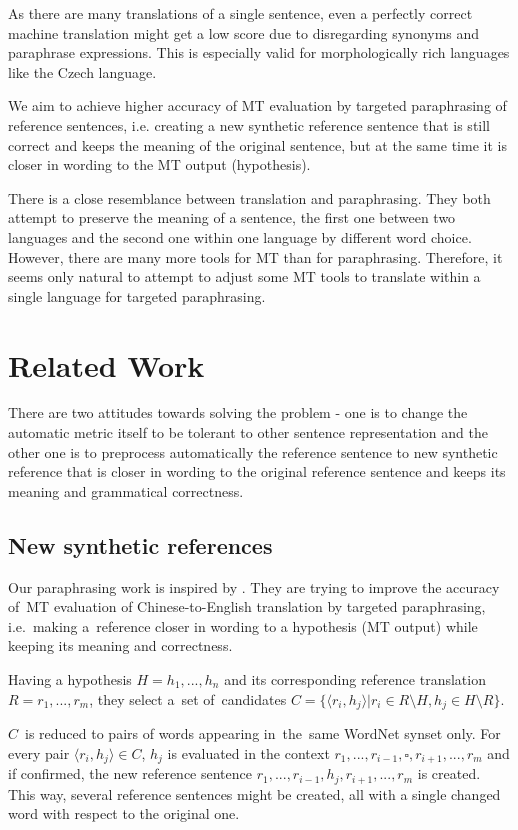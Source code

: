 \documentclass[11pt]{article}
\begin{document}
As there are many translations of a single sentence, even a perfectly correct 
machine translation might get a low score due to disregarding synonyms and 
paraphrase expressions. This is especially valid for morphologically rich 
languages like the Czech language. \cite{bojar-tackling-sparse-data}

%


We aim to achieve higher accuracy of MT evaluation by targeted paraphrasing 
of reference sentences, i.e. creating a new synthetic reference sentence that 
is still correct and keeps the meaning of the original sentence, but at the 
same time it is closer in wording to the MT output (hypothesis). 

There is a close resemblance between translation and paraphrasing. They both 
attempt to preserve the meaning of a sentence, the first one between two languages 
and the second one within one language by different word choice. \cite{madnani:2010} 
However, there are many more tools for MT than for paraphrasing. Therefore, it 
seems only natural to attempt to adjust some MT tools to translate within a 
single language for targeted paraphrasing. 


\section{Related Work}
There are two attitudes towards solving the problem - one is to change the automatic metric itself to be tolerant to other sentence representation and the other one is to preprocess automatically the reference sentence to new synthetic reference that is closer in wording to the original reference sentence and keeps its meaning and grammatical correctness.
\subsection{New synthetic references}
Our paraphrasing work is inspired by . They are trying to improve the 
accuracy of~MT evaluation of Chinese-to-English translation by targeted paraphrasing, i.e.~making 
a~reference closer in wording to a hypothesis (MT output) while keeping its meaning and correctness.

Having a hypothesis $ H = h_1,...,h_n $ and its corresponding reference translation $ R =r_1, ...,r_m $,
they select a~set of~candidates $ C = \lbrace \langle r_i,h_j \rangle  \vert r_i \in R \setminus H
 , h_j \in H \setminus R \rbrace $. 
 
$ C $~is reduced to pairs of words appearing in~the~same WordNet \cite{wordnet} synset only. For every pair 
$  \langle r_i,h_j \rangle \in C $, $ h_j $ is evaluated in the context $ r_1,...,r_{i-1},\square,r_{i+1},...,r_m $
and if confirmed, the new reference sentence $ r_1,...,r_{i-1},h_j,r_{i+1},...,r_m $ is created.
This way, several reference sentences might be created, all with a single changed word with respect
to the original one.
\end{document}
